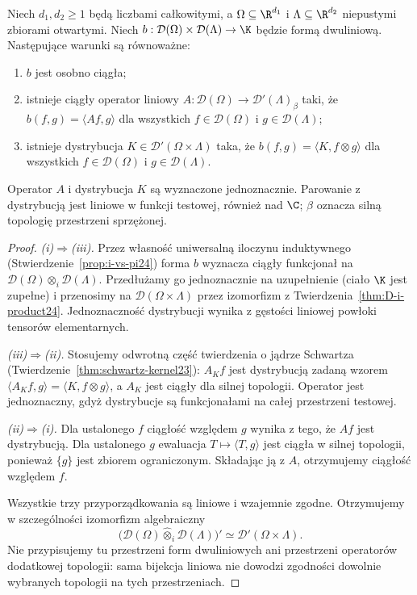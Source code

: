 \begin{wniosek}
\label{cor:kernel-i24}
Niech $d_1,d_2\ge1$ będą liczbami całkowitymi,
a $\Omega\subseteq\R^{d_1}$ i $\Lambda\subseteq\R^{d_2}$
niepustymi zbiorami otwartymi. Niech
$b:\mathcal D(\Omega)\times\mathcal D(\Lambda)\to\K$
będzie formą dwuliniową. Następujące warunki są równoważne:
\begin{enumerate}[label=\textup{(\roman*)},leftmargin=*]
\item $b$ jest osobno ciągła;
\item istnieje ciągły operator liniowy
$A:\mathcal D(\Omega)\to\mathcal D'(\Lambda)_\beta$
taki, że $b(f,g)=\langle Af,g\rangle$ dla wszystkich
$f\in\mathcal D(\Omega)$ i $g\in\mathcal D(\Lambda)$;
\item istnieje dystrybucja
$K\in\mathcal D'(\Omega\times\Lambda)$ taka, że
$b(f,g)=\langle K,f\otimes g\rangle$ dla wszystkich
$f\in\mathcal D(\Omega)$ i $g\in\mathcal D(\Lambda)$.
\end{enumerate}
Operator $A$ i dystrybucja $K$ są wyznaczone jednoznacznie.
Parowanie z dystrybucją jest liniowe w funkcji testowej,
również nad $\C$; $\beta$ oznacza silną topologię
przestrzeni sprzężonej.
\end{wniosek}
\begin{proof}
\emph{(i)$\Rightarrow$(iii).}
Przez własność uniwersalną iloczynu induktywnego
(Stwierdzenie~\ref{prop:i-vs-pi24}) forma $b$
wyznacza ciągły funkcjonał na
$\mathcal D(\Omega)\otimes_i\mathcal D(\Lambda)$.
Przedłużamy go jednoznacznie na uzupełnienie (ciało
$\K$ jest zupełne) i przenosimy na
$\mathcal D(\Omega\times\Lambda)$ przez izomorfizm
z Twierdzenia~\ref{thm:D-i-product24}.
Jednoznaczność dystrybucji wynika z gęstości
liniowej powłoki tensorów elementarnych.

\emph{(iii)$\Rightarrow$(ii).}
Stosujemy odwrotną część twierdzenia o jądrze
Schwartza (Twierdzenie~\ref{thm:schwartz-kernel23}):
$A_Kf$ jest dystrybucją zadaną wzorem
$\langle A_Kf,g\rangle=\langle K,f\otimes g\rangle$,
a $A_K$ jest ciągły dla silnej topologii.
Operator jest jednoznaczny, gdyż dystrybucje
są funkcjonałami na całej przestrzeni testowej.

\emph{(ii)$\Rightarrow$(i).}
Dla ustalonego $f$ ciągłość względem $g$ wynika
z tego, że $Af$ jest dystrybucją. Dla ustalonego
$g$ ewaluacja $T\mapsto\langle T,g\rangle$ jest
ciągła w silnej topologii, ponieważ $\{g\}$
jest zbiorem ograniczonym. Składając ją z $A$,
otrzymujemy ciągłość względem $f$.

Wszystkie trzy przyporządkowania są liniowe
i wzajemnie zgodne. Otrzymujemy w szczególności
izomorfizm algebraiczny
\[
 \bigl(\mathcal D(\Omega)\widehat\otimes_i
 \mathcal D(\Lambda)\bigr)'
 \simeq\mathcal D'(\Omega\times\Lambda).
\]
Nie przypisujemy tu przestrzeni form dwuliniowych
ani przestrzeni operatorów dodatkowej topologii:
sama bijekcja liniowa nie dowodzi zgodności
dowolnie wybranych topologii na tych przestrzeniach.
\end{proof}

